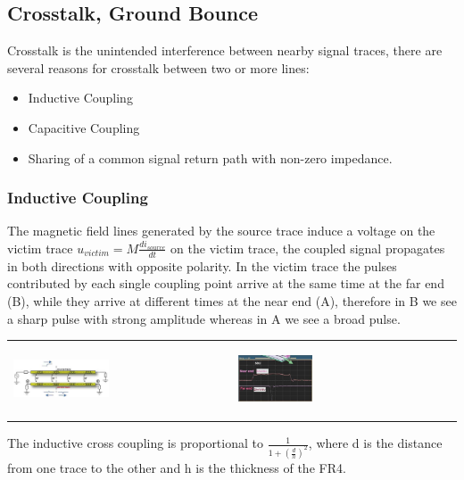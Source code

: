 	\subsection{Crosstalk, Ground Bounce}
		Crosstalk is the unintended interference between nearby signal traces, there are several reasons for crosstalk between two or more lines: 
		\begin{itemize}
			\setlength{\itemsep}{-4pt}
			\item Inductive Coupling
			\item Capacitive Coupling 
			\item Sharing of a common signal return path with non-zero impedance. 
		\end{itemize}
		\subsubsection{Inductive Coupling}
			The magnetic field lines generated by the source trace induce a voltage on the victim trace $u_{victim} = M \frac{di_{source}}{dt}$ on the victim trace, the coupled signal propagates in both directions with opposite polarity. In the victim trace the pulses contributed by each single coupling point arrive at the same time at the far end (B), while they arrive at different times at the near end (A), therefore in B we see a sharp pulse with strong amplitude whereas in A we see a broad pulse. 
			\begin{table}[h!]
				\centering
				\begin{tabular}{m{} m{} }
				
					\begin{center}\includegraphics[width=0.45\textwidth]{images/InductiveCoupling1.png}\end{center}  
				&
					\begin{center}\includegraphics[width=0.35\textwidth]{images/InductiveCoupling2.png}\end{center} 
				\\
			
				\end{tabular}
			\end{table}	
			The inductive cross coupling is proportional to $\frac{1}{1+\left(\frac{d}{h}\right)^2}$, where d is the distance from one trace to the other and h is the 	thickness of the FR4. 
		
